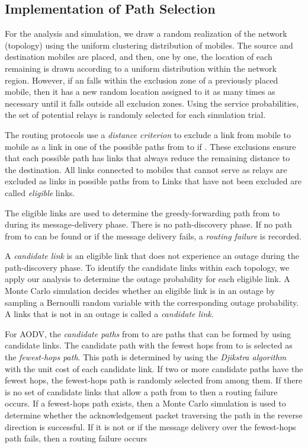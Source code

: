 \documentclass[conference]{IEEEtran}
\begin{document}
\subsection{Implementation of Path Selection}

For the analysis and simulation, we draw a random
realization of the network (topology) using the uniform clustering distribution of mobiles. The source and
destination mobiles are placed, and then, one by one,
the location of each remaining
 is drawn according to a uniform distribution within the network region. However, if an
 falls within the exclusion zone of
a previously placed mobile, then it has a new random
location assigned to it as many times as necessary until
it falls outside all exclusion zones. Using the service
probabilities, the set of potential relays is randomly
selected for each simulation trial.

The routing protocols use a \emph{distance criterion} to exclude a link from
mobile  to mobile  as a link in one of the possible paths from
 to  if . These
exclusions ensure that each possible path has links that always
reduce the remaining distance to the destination. All links connected to mobiles that cannot serve as relays are
excluded as links in possible paths from  to  Links that have
not been excluded are called \emph{eligible} links.

The eligible links are used to determine the greedy-forwarding path from
 to 
during its message-delivery phase. There is no path-discovery phase. If no
path from  to can be found or if the message
delivery fails, a \emph{routing failure} is recorded.

A \emph{candidate link} is an eligible link that does not experience an outage during the path-discovery phase. To identify the candidate links within each topology, we apply our analysis to determine the outage probability for each eligible link. A Monte Carlo simulation decides
whether an eligible link is in an outage by sampling a
Bernoulli random variable with the corresponding outage
probability. A links that is not in an outage is called a
\emph{candidate link}.

For AODV, the \emph{candidate paths} from  to  are paths that
can be formed by using candidate links. The candidate path with the fewest hops from  to 
is selected as the
\emph{fewest-hops path}. This path is
determined by using the
\emph{Djikstra algorithm}
\cite{bru} with the
unit cost of each candidate link. If two or more candidate
paths have the fewest hops, the fewest-hops path is
randomly selected from among them. If there is no set
of candidate links that allow a path from
 to 
then a routing failure occurs. If a fewest-hops path exists,
then a Monte Carlo simulation is used to determine
whether the acknowledgement packet traversing the path
in the reverse direction is successful. If it is not or if the
message delivery over the fewest-hops path fails, then a
routing failure occurs
\end{document}
